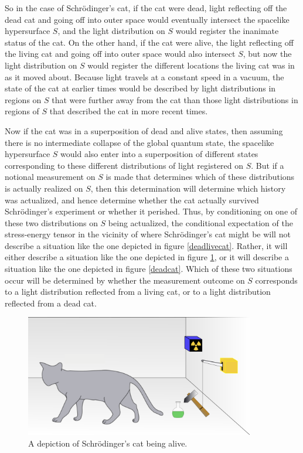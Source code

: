 So in the case of Schr\"{o}dinger's cat, if the cat were dead,  light reflecting off the dead cat and going off into outer space would eventually intersect the spacelike hypersurface $S$, and the light distribution on $S$ would register the inanimate status of the cat. On the other hand, if the cat were alive, the light reflecting off the living cat and going off into outer space would also intersect $S$, but now the light distribution on $S$ would register the different locations the living cat was in as it moved about. Because light travels at a constant speed in a vacuum, the state of the cat at earlier times would be described by light distributions in regions on $S$ that were further away from the cat than those light distributions in regions of $S$ that described the cat in more recent times. 

Now if the cat was in a superposition of dead and alive states, then assuming there is no intermediate collapse of the global quantum state,  the spacelike hypersurface $S$ would also enter into a superposition of different states corresponding to these different distributions of light registered on $S$. But if a notional measurement on $S$ is made that determines which of these distributions is actually realized on $S$, then this determination will determine which history was actualized, and hence determine whether the cat actually survived Schr\"{o}dinger's experiment or whether it perished.   Thus, by conditioning on one of these two distributions on $S$ being actualized, the conditional expectation of the stress-energy tensor in the vicinity of where Schr\"{o}dinger's cat might be 
will not describe a situation like the one depicted in figure \ref{deadlivecat}.   Rather, it will either describe a situation like the one depicted in figure \ref{livecat}, or it will describe a situation like the one depicted in figure \ref{deadcat}. Which of these two situations occur will be determined by whether the measurement outcome on $S$ corresponds to a light distribution reflected from a living cat, or to a light distribution reflected from a dead cat. 
\begin{figure}[ht!]
  \captionsetup{justification=justified}
  \centering
  \includegraphics[width=100mm]{Chapter03/Schrodingers_livecat.png}
  \caption[Caption for LOF]{A depiction of Schr\"{o}dinger's cat being alive.\protect\footnotemark}
  \label{livecat}
  \end{figure}

